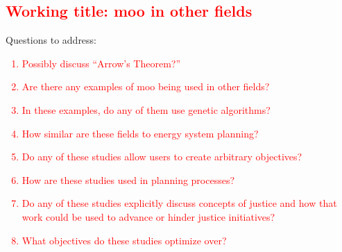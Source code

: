 \subsection{\textcolor{red}{Working title: \Ac{moo} in other fields}}

Questions to address:

\textcolor{red}{\begin{enumerate}
    \item Possibly discuss ``Arrow's Theorem?'' \cite{franssen_arrows_2005}
    \item Are there any examples of \ac{moo} being used in other fields?
    \item In these examples, do any of them use genetic algorithms?
    \item How similar are these fields to energy system planning?
    \item Do any of these studies allow users to create arbitrary objectives?
    \item How are these studies used in planning processes?
    \item Do any of these studies explicitly discuss concepts of justice and how
    that work could be used to advance or hinder justice initiatives?
    \item What objectives do these studies optimize over?
\end{enumerate}}